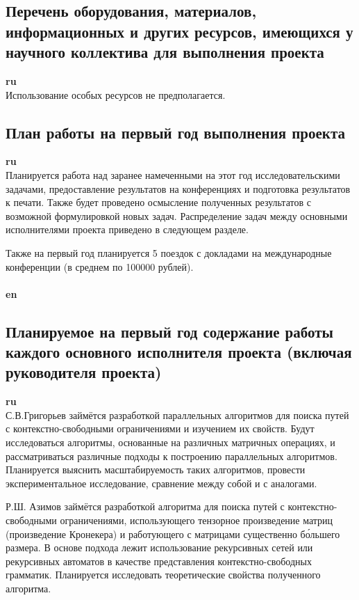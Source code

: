 \documentclass[12pt]{article}  %
\theoremstyle{remark}
\begin{document}
\subsection{Перечень оборудования, материалов, информационных и других ресурсов, имеющихся у научного коллектива для выполнения проекта}
\textbf{ru}\\
%
Использование особых ресурсов не предполагается.

\subsection{План работы на первый год выполнения проекта}

\textbf{ru}\\
%
Планируется работа над заранее намеченными на этот год исследовательскими задачами, предоставление результатов на конференциях и подготовка результатов к печати.
Также будет проведено осмысление полученных результатов с возможной формулировкой новых задач. Распределение задач между основными исполнителями проекта приведено в следующем разделе. 

Также на первый год планируется 5 поездок с докладами на международные конференции (в среднем по 100000 рублей).
\\
\\
\textbf{en}\\


\subsection{Планируемое на первый год содержание работы каждого основного исполнителя проекта (включая руководителя проекта)}

\textbf{ru}\\
%
С.В.Григорьев займётся разработкой параллельных алгоритмов для поиска путей с контекстно-свободными ограничениями и изучением их свойств. 
Будут исследоваться алгоритмы, основанные на различных матричных операциях, и рассматриваться различные подходы к построению параллельных алгоритмов. 
Планируется выяснить масштабируемость таких алгоритмов, провести экспериментальное исследование, сравнение между собой и с аналогами.

Р.Ш. Азимов займётся разработкой алгоритма для поиска путей с контекстно-свободными ограничениями, использующего тензорное произведение матриц (произведение Кронекера) и работующего с матрицами существенно б\'{о}льшего размера. 
В основе подхода лежит использование рекурсивных сетей или рекурсивных автоматов в качестве представления контекстно-свободных грамматик.
Планируется исследовать теоретические свойства полученного алгоритма.
\end{document}
